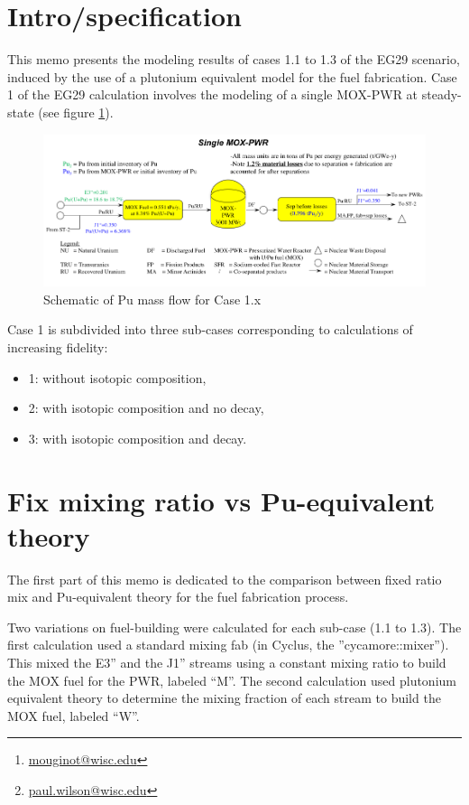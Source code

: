 \documentclass[10pt]{article}
\title{}
\author[1]{B. Mouginot  \thanks{\href{mailto:mouginot@wisc.edu}{mouginot@wisc.edu}}}
\author[1]{P.P.H. Wilson\thanks{\href{mailto:paul.wilson@wisc.edu}{paul.wilson@wisc.edu}}}
\author[1]{R. Carlsen}
\author[1]{A. Opotowsky}
\affil[1]{University of Wisconsin--Madison, Department of Engineering Physics, CNERG group}
\date{\today}
\begin{document}
\maketitle

\section{Intro/specification}

This memo presents the modeling results of cases 1.1 to 1.3 of the EG29
scenario, induced by the use of a plutonium equivalent model for the fuel
fabrication. Case 1 of the EG29 calculation involves the modeling of a single
MOX-PWR at steady-state (see figure \ref{fig:puflow}).

\begin{figure}[h!]
  \centering
  \includegraphics[width=1\textwidth]  {img/puflow}
  \caption{Schematic of Pu mass flow for Case 1.x}
  \label{fig:puflow}
\end{figure}

Case 1 is subdivided into three sub-cases corresponding to calculations of
increasing fidelity: 
\begin{itemize}
  \item	1: without isotopic composition, 
  \item 2: with isotopic composition and no decay,
  \item 3: with isotopic composition and decay.
\end{itemize}


\section{Fix mixing ratio vs Pu-equivalent theory}

The first part of this memo is dedicated to the comparison between fixed ratio
mix and Pu-equivalent theory for the fuel fabrication process.

Two variations on fuel-building were calculated for each sub-case (1.1 to 1.3).
The first calculation used a standard mixing fab (in Cyclus, the
''cycamore::mixer''). This mixed the E3” and the J1” streams using a constant mixing
ratio to build the MOX fuel for the PWR, labeled “M”. The second calculation
used plutonium equivalent theory to determine the mixing fraction of each stream
to build the MOX fuel, labeled “W”.
\end{document}

